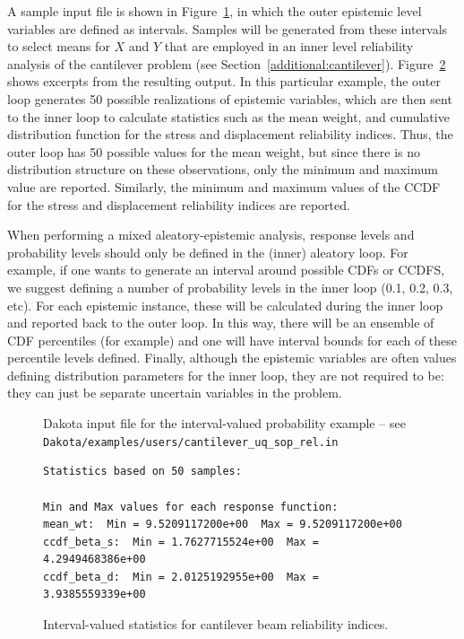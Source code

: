 A sample input file is shown in Figure~\ref{adv_models:2ndprob}, in
which the outer epistemic level variables are defined as
intervals. Samples will be generated from these intervals to select
means for $X$ and $Y$ that are employed in an inner level reliability
analysis of the cantilever problem (see
Section~\ref{additional:cantilever}).
Figure~\ref{adv_models:2ndprob_res} shows excerpts from the resulting
output. In this particular example, the outer loop generates 50
possible realizations of epistemic variables, which are then sent to
the inner loop to calculate statistics such as the mean weight, and
cumulative distribution function for the stress and displacement
reliability indices. Thus, the outer loop has 50 possible values for
the mean weight, but since there is no distribution structure on these
observations, only the minimum and maximum value are reported.
Similarly, the minimum and maximum values of the CCDF for the stress
and displacement reliability indices are reported.

When performing a mixed aleatory-epistemic analysis, response levels and 
probability levels should only be defined in the (inner) aleatory loop. 
For example, if one wants to generate an interval around possible 
CDFs or CCDFS, we suggest defining a number of probability levels 
in the inner loop (0.1, 0.2, 0.3, etc). For each epistemic instance, 
these will be calculated during the inner loop and reported back to the 
outer loop. In this way, there will be an ensemble of CDF percentiles 
(for example) and one will have interval bounds for each of these 
percentile levels defined. Finally, although the epistemic variables are 
often values defining distribution parameters for the inner loop, 
they are not required to be: they can just be separate uncertain variables 
in the problem. 
\begin{figure}
  \centering
  \begin{bigbox}
    \begin{tiny}
    \end{tiny}
  \end{bigbox}
  \caption{Dakota input file for the interval-valued probability example --
see \texttt{Dakota/examples/users/cantilever\_uq\_sop\_rel.in} }
  \label{adv_models:2ndprob}
\end{figure}

\begin{figure}
\centering
\begin{bigbox}
\begin{small}
\begin{verbatim}
Statistics based on 50 samples:

Min and Max values for each response function:
mean_wt:  Min = 9.5209117200e+00  Max = 9.5209117200e+00
ccdf_beta_s:  Min = 1.7627715524e+00  Max = 4.2949468386e+00
ccdf_beta_d:  Min = 2.0125192955e+00  Max = 3.9385559339e+00
\end{verbatim}
\end{small}
\end{bigbox}
\caption{Interval-valued statistics for cantilever beam reliability indices.}
\label{adv_models:2ndprob_res}
\end{figure}

